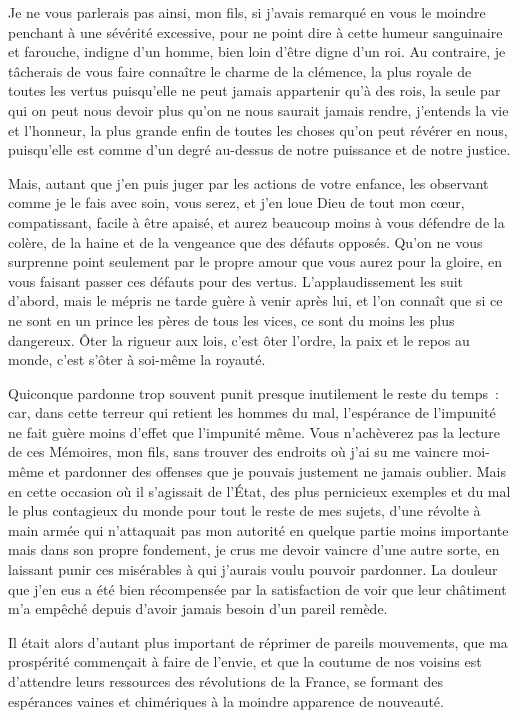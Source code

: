\documentclass[french,twoside]{book} %
\begin{document}
Je ne vous parlerais pas ainsi, mon fils, si j’avais remarqué en vous le moindre penchant à une sévérité excessive, pour ne point dire à cette humeur sanguinaire et farouche, indigne d’un homme, bien loin d’être digne d’un roi. Au contraire, je tâcherais de vous faire connaître le charme de la clémence, la plus royale de toutes les vertus puisqu’elle ne peut jamais appartenir qu’à des rois, la seule par qui on peut nous devoir plus qu’on ne nous saurait jamais rendre, j’entends la vie et l’honneur, la plus grande enfin de toutes les choses qu’on peut révérer en nous, puisqu’elle est comme d’un degré au-dessus de notre puissance et de notre justice.\par
Mais, autant que j’en puis juger par les actions de votre enfance, les observant comme je le fais avec soin, vous serez, et j’en loue Dieu de tout mon cœur, compatissant, facile à être apaisé, et aurez beaucoup moins à vous défendre de la colère, de la haine et de la vengeance que des défauts opposés. Qu’on ne vous surprenne point seulement par le propre amour que vous aurez pour la gloire, en vous faisant passer ces défauts pour des vertus. L’applaudissement les suit d’abord, mais le mépris ne tarde guère à venir après lui, et l’on connaît que si ce ne sont en un prince les pères de tous les vices, ce sont du moins les plus dangereux. Ôter la rigueur aux lois, c’est ôter l’ordre, la paix et le repos au monde, c’est s’ôter à soi-même la royauté.\par
Quiconque pardonne trop souvent punit presque inutilement le reste du temps : car, dans cette terreur qui retient les hommes du mal, l’espérance de l’impunité ne fait guère moins d’effet que l’impunité même. Vous n’achèverez pas la lecture de ces Mémoires, mon fils, sans trouver des endroits où j’ai su me vaincre moi-même et pardonner des offenses que je pouvais justement ne jamais oublier. Mais en cette occasion où il s’agissait de l’État, des plus pernicieux exemples et du mal le plus contagieux du monde pour tout le reste de mes sujets, d’une révolte à main armée qui n’attaquait pas mon autorité en quelque partie moins importante mais dans son propre fondement, je crus me devoir vaincre d’une autre sorte, en laissant punir ces misérables à qui j’aurais voulu pouvoir pardonner. La douleur que j’en eus a été bien récompensée par la satisfaction de voir que leur châtiment m’a empêché depuis d’avoir jamais besoin d’un pareil remède.\par
Il était alors d’autant plus important de réprimer de pareils mouvements, que ma prospérité commençait à faire de l’envie, et que la coutume de nos voisins est d’attendre leurs ressources des révolutions de la France, se formant des espérances vaines et chimériques à la moindre apparence de nouveauté.\par
\end{document}
